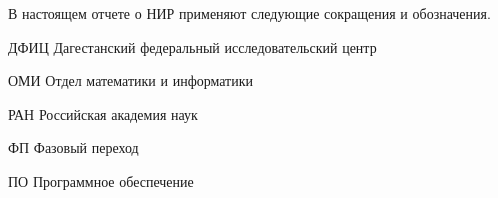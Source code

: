 \documentclass[utf8,usehyperref,12pt]{G7-32}
\begin{document}

\frontmatter %

\NirTitle{}

\Executors %




\setcounter{tocdepth}{2} %

\tableofcontents


\Abbreviations %
В настоящем отчете о НИР применяют следующие сокращения и обозначения.
\begin{abbreviation}
\item[ДФИЦ] Дагестанский федеральный исследовательский центр
\item[ОМИ] Отдел математики и информатики
\item[РАН] Российская академия наук
\item[ФП] Фазовый переход
\item[ПО] Программное обеспечение
\end{abbreviation}



\mainmatter %



\backmatter %



\end{document}

